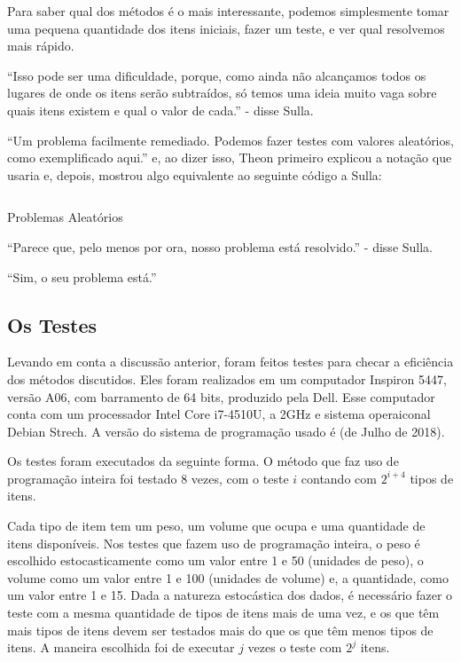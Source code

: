 Para saber qual dos métodos é o mais interessante, podemos
simplesmente tomar uma pequena quantidade dos itens iniciais, fazer
um teste, e ver qual resolvemos mais rápido.

``Isso pode ser uma dificuldade, porque, como ainda não alcançamos
todos os lugares de onde os itens serão subtraídos, só temos uma
ideia muito vaga sobre quais itens existem e qual o valor de cada.''
- disse Sulla.

``Um problema facilmente remediado. Podemos fazer testes com valores
aleatórios, como exemplificado aqui.'' e, ao dizer isso, Theon
primeiro explicou a notação que usaria e, depois, mostrou algo
equivalente ao seguinte código a Sulla:

\begin{listing}[H]
  \inputminted{prolog}{../Exemplos/Cap12/test/random.ecl}
  \caption{Problemas Aleatórios}\label{lst:random}
\end{listing}

``Parece que, pelo menos por ora, nosso problema está resolvido.'' -
disse Sulla.

``Sim, o seu problema está.''

\subsection{Os Testes}

Levando em conta a discussão anterior, foram feitos testes para
checar a eficiência dos métodos discutidos. Eles foram realizados em
um computador Inspiron 5447, versão A06, com barramento de 64 bits,
produzido pela Dell. Esse computador conta com um processador Intel
Core i7-4510U, a 2GHz e sistema operaiconal Debian Strech. A versão do
sistema de programação usado é  (de Julho de 2018). 

Os testes foram executados da seguinte forma. O método que faz uso de
programação inteira foi testado 8 vezes, com o teste $i$ contando
com $2^{i+4}$ tipos de itens.

Cada tipo de item tem um peso, um volume que ocupa e uma quantidade
de itens disponíveis. Nos testes que fazem uso de programação
inteira, o peso é escolhido estocasticamente como um valor entre 1 e
50 (unidades de peso), o volume como um valor entre 1 e 100
(unidades de volume) e, a quantidade, como um valor entre 1 e
15. Dada a natureza estocástica dos dados, é necessário fazer o
teste com a mesma quantidade de tipos de itens mais de uma vez, e os
que têm mais tipos de itens devem ser testados mais do que os que
têm menos tipos de itens. A maneira escolhida foi de executar $j$ vezes
o teste com $2^j$ itens.

